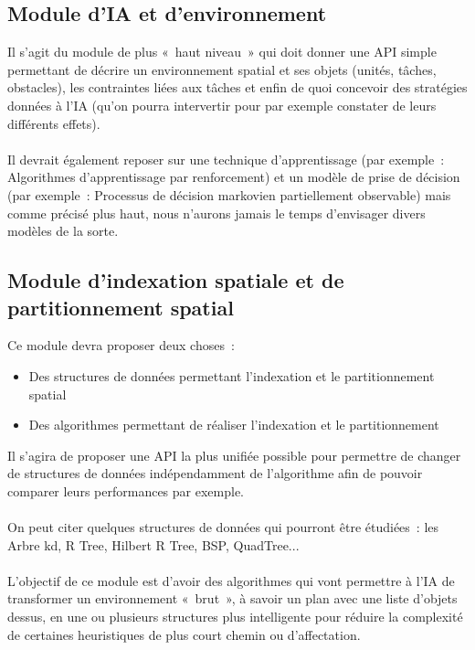 \subsection{Module d'IA et d'environnement}

Il s'agit du module de plus « haut niveau » qui doit donner une API simple permettant de décrire un environnement spatial et ses objets (unités, tâches, obstacles), les contraintes liées aux tâches et enfin de quoi concevoir des stratégies données à l'IA (qu'on pourra intervertir pour par exemple constater de leurs différents effets).\\\\

Il devrait également reposer sur une technique d'apprentissage (par exemple : Algorithmes d'apprentissage par renforcement)  et un modèle de prise de décision (par exemple : Processus de décision markovien partiellement observable) mais comme précisé plus haut, nous n'aurons jamais le temps d'envisager divers modèles de la sorte.

\subsection{Module d'indexation spatiale et de partitionnement spatial}

Ce module devra proposer deux choses :
\begin{itemize}
\item Des structures de données permettant l'indexation et le partitionnement spatial
\item Des algorithmes permettant de réaliser l'indexation et le partitionnement
\end{itemize}

Il s'agira de proposer une API la plus unifiée possible pour permettre de changer de structures de données indépendamment de l'algorithme afin de pouvoir comparer leurs performances par exemple.\\\\

On peut citer quelques structures de données qui pourront être étudiées : les Arbre kd, R Tree, Hilbert R Tree, BSP, QuadTree...\\\\

L'objectif de ce module est d'avoir des algorithmes qui vont permettre à l'IA de transformer un environnement « brut », à savoir un plan avec une liste d'objets dessus, en une ou plusieurs structures plus intelligente pour réduire la complexité de certaines heuristiques de plus court chemin ou d'affectation.

